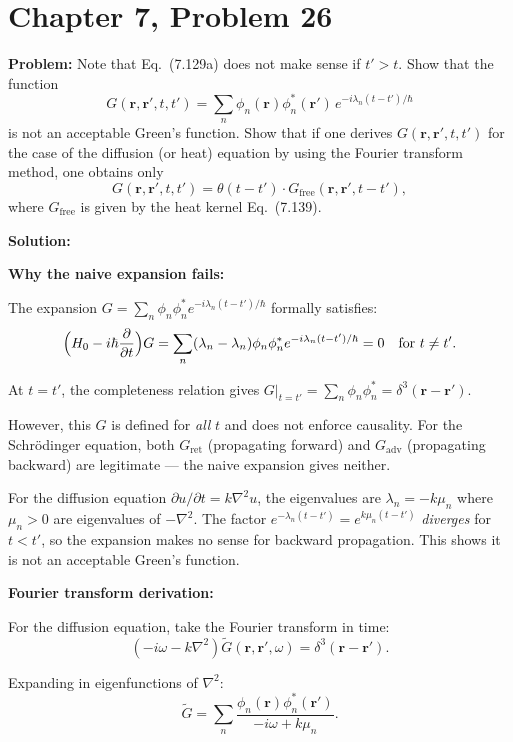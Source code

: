 \documentclass[12pt]{article}
\begin{document}
\section*{Chapter 7, Problem 26}

\textbf{Problem:} Note that Eq.\ (7.129a) does not make sense if $t' > t$. Show that the function
\[
G(\mathbf{r},\mathbf{r}',t,t') = \sum_n \phi_n(\mathbf{r})\phi_n^*(\mathbf{r}')\,e^{-i\lambda_n(t-t')/\hbar}
\]
is not an acceptable Green's function. Show that if one derives $G(\mathbf{r},\mathbf{r}',t,t')$ for the case of the diffusion (or heat) equation by using the Fourier transform method, one obtains only
\[
G(\mathbf{r},\mathbf{r}',t,t') = \theta(t-t')\cdot G_{\mathrm{free}}(\mathbf{r},\mathbf{r}',t-t'),
\]
where $G_{\mathrm{free}}$ is given by the heat kernel Eq.\ (7.139).

\bigskip
\textbf{Solution:}

\textbf{Why the naive expansion fails:}

The expansion $G = \sum_n \phi_n\phi_n^*e^{-i\lambda_n(t-t')/\hbar}$ formally satisfies:
\[
\Bigl(H_0 - i\hbar\frac{\partial}{\partial t}\Bigr)G = \sum_n (\lambda_n - \lambda_n)\phi_n\phi_n^*e^{-i\lambda_n(t-t')/\hbar} = 0 \quad \text{for } t \neq t'.
\]

At $t = t'$, the completeness relation gives $G|_{t=t'} = \sum_n\phi_n\phi_n^* = \delta^3(\mathbf{r}-\mathbf{r}')$.

However, this $G$ is defined for \textit{all} $t$ and does not enforce causality. For the Schr\"odinger equation, both $G_{\mathrm{ret}}$ (propagating forward) and $G_{\mathrm{adv}}$ (propagating backward) are legitimate --- the naive expansion gives neither.

For the diffusion equation $\partial u/\partial t = k\nabla^2 u$, the eigenvalues are $\lambda_n = -k\mu_n$ where $\mu_n > 0$ are eigenvalues of $-\nabla^2$. The factor $e^{-\lambda_n(t-t')} = e^{k\mu_n(t-t')}$ \textit{diverges} for $t < t'$, so the expansion makes no sense for backward propagation. This shows it is not an acceptable Green's function.

\textbf{Fourier transform derivation:}

For the diffusion equation, take the Fourier transform in time:
\[
(-i\omega - k\nabla^2)\tilde{G}(\mathbf{r},\mathbf{r}',\omega) = \delta^3(\mathbf{r}-\mathbf{r}').
\]

Expanding in eigenfunctions of $\nabla^2$:
\[
\tilde{G} = \sum_n \frac{\phi_n(\mathbf{r})\phi_n^*(\mathbf{r}')}{-i\omega + k\mu_n}.
\]
\end{document}
